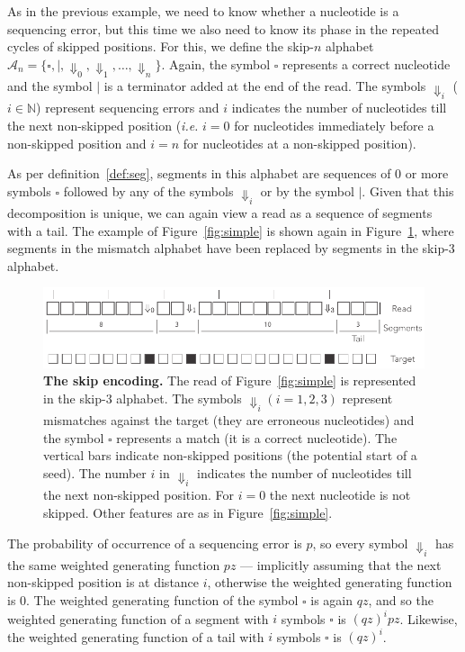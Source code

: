 \documentclass{article}
\begin{document}
As in the previous example, we need to know whether a nucleotide is a
sequencing error, but this time we also need to know its phase in the
repeated cycles of skipped positions. For this, we define the skip-$n$
alphabet $\mathcal{A}_n = \{\square, |, \Downarrow_0, \Downarrow_1,
\ldots, \Downarrow_n \}$. Again, the symbol $\square$ represents a correct
nucleotide and the symbol $|$ is a terminator added at the end of the
read. The symbols $\Downarrow_i$ ($i \in \mathbb{N}$) represent sequencing
errors and $i$ indicates the number of nucleotides till the next
non-skipped position (\textit{i.e.} $i=0$ for nucleotides immediately
before a non-skipped position and $i=n$ for nucleotides at a non-skipped
position).

As per definition~\ref{def:seg}, segments in this alphabet are sequences
of 0 or more symbols $\square$ followed by any of the symbols
$\Downarrow_i$ or by the symbol $|$. Given that this decomposition is
unique, we can again view a read as a sequence of segments with a tail.
The example of Figure~\ref{fig:simple} is shown again in
Figure~\ref{fig:skip}, where segments in the mismatch alphabet have been
replaced by segments in the skip-3 alphabet.

\begin{figure}[h]
\centering
\includegraphics[scale=0.85]{sketch_skip.pdf}
\caption{\textbf{The skip encoding.}
The read of Figure~\ref{fig:simple} is represented in the skip-3 alphabet.
The symbols $\Downarrow_i (i = 1,2,3)$ represent mismatches against the
target (they are erroneous nucleotides) and the symbol $\square$
represents a match (it is a correct nucleotide). The vertical bars
indicate non-skipped positions (the potential start of a seed). The number
$i$ in $\Downarrow_i$ indicates the number of nucleotides till the next
non-skipped position. For $i=0$ the next nucleotide is not skipped.
Other features are as in Figure~\ref{fig:simple}.}
\label{fig:skip}
\end{figure}

The probability of occurrence of a sequencing error is $p$, so every
symbol $\Downarrow_i$ has the same weighted generating function $pz$ ---
implicitly assuming that the next non-skipped position is at distance $i$,
otherwise the weighted generating function is 0. The weighted generating
function of the symbol $\square$ is again $qz$, and so the weighted
generating function of a segment with $i$ symbols $\square$ is $(qz)^ipz$.
Likewise, the weighted generating function of a tail with $i$ symbols
$\square$ is $(qz)^i$.
\end{document}
